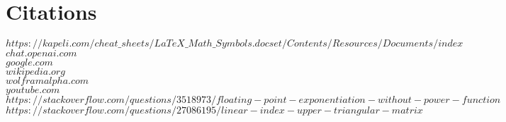 \documentclass[11pt]{article}
\begin{document}
\newpage
\section*{Citations}
\rbrack \hspace{1mm} $https://kapeli.com/cheat\_sheets/LaTeX\_Math\_Symbols.docset/Contents/Resources/Documents/index$\\
\rbrack \hspace{1mm} $chat.openai.com$\\
\rbrack \hspace{1mm} $google.com$\\
\rbrack \hspace{1mm} $wikipedia.org$\\
\rbrack \hspace{1mm} $wolframalpha.com$\\
\rbrack \hspace{1mm} $youtube.com$\\
\rbrack \hspace{1mm} $https://stackoverflow.com/questions/3518973/floating-point-exponentiation-without-power-function$\\
\rbrack \hspace{1mm} $https://stackoverflow.com/questions/27086195/linear-index-upper-triangular-matrix$\\
\end{document}
